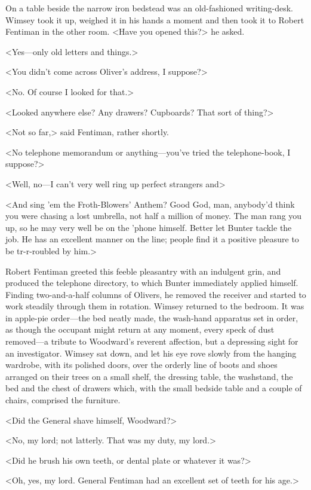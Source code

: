 On a table beside the narrow iron bedstead was an old-fashioned writing-desk. Wimsey took it up, weighed it in his hands a moment and then took it to Robert Fentiman in the other room. <Have you opened this?> he asked.

<Yes—only old letters and things.>

<You didn't come across Oliver's address, I suppose?>

<No. Of course I looked for that.>

<Looked anywhere else? Any drawers? Cupboards? That sort of thing?>

<Not so far,> said Fentiman, rather shortly.

<No telephone memorandum or anything—you've tried the telephone-book, I suppose?>

<Well, no—I can't very well ring up perfect strangers and\longdash>

<And sing 'em the Froth-Blowers' Anthem? Good God, man, anybody'd think you were chasing a lost umbrella, not half a million of money. The man rang you up, so he may very well be on the 'phone himself. Better let Bunter tackle the job. He has an excellent manner on the line; people find it a positive pleasure to be tr-r-roubled by him.>

Robert Fentiman greeted this feeble pleasantry with an indulgent grin, and produced the telephone directory, to which Bunter immediately applied himself. Finding two-and-a-half columns of Olivers, he removed the receiver and started to work steadily through them in rotation. Wimsey returned to the bedroom. It was in apple-pie order—the bed neatly made, the wash-hand apparatus set in order, as though the occupant might return at any moment, every speck of dust removed—a tribute to Woodward's reverent affection, but a depressing sight for an investigator. Wimsey sat down, and let his eye rove slowly from the hanging wardrobe, with its polished doors, over the orderly line of boots and shoes arranged on their trees on a small shelf, the dressing table, the washstand, the bed and the chest of drawers which, with the small bedside table and a couple of chairs, comprised the furniture.

<Did the General shave himself, Woodward?>

<No, my lord; not latterly. That was my duty, my lord.>

<Did he brush his own teeth, or dental plate or whatever it was?>

<Oh, yes, my lord. General Fentiman had an excellent set of teeth for his age.>

